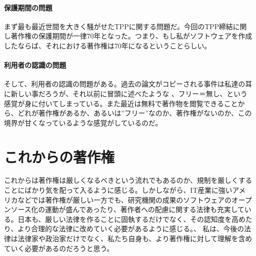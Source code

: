 \documentclass[a4j]{jsarticle}
\begin{document}
\subsection*{保護期間の問題}
まず最も最近世間を大きく騒がせたTPPに関する問題だ。今回のTPP締結に関し著作権の保護期間が一律70年となった。つまり、もし私がソフトウェアを作成したならば、それにおける著作権は70年になるということらしい。\cite{def_re}
\subsection*{利用者の認識の問題}
そして、利用者の認識の問題がある。過去の論文がコピーされる事件は私達の耳に新しい事だろうが、それ以前に冒頭に述べたような 、フリー＝無し、という感覚が身に付いてしまっている。また最近は無料で著作物を閲覧できることから、どれが著作権があるか、あるいは”フリー”なのか、著作権がないのか、この境界が甘くなっているような感覚がしているのだ。
\part{これからの著作権}
これからは著作権は厳しくなるべきという流れでもあるのか、規制を厳しくすることにばかり気を配って入るように感じる。しかしながら、IT産業に強いアメリカなどでは著作権が厳しい一方でも、研究機関の成果のソフトウェアのオープンソース化の運動が盛んであったり、著作者への配慮に関する法律も充実している。日本も、厳しい法律を作ることに固執するだけでなく、その認知度を高めたり、より合理的な法律に改めていく必要があるように感じる。\cite{def_m_o}、
私は、今後の法律は法律家や政治家だけでなく、私たち自身も、より著作権に対して理解を含めていく必要があるのだろうと思う。



\end{document}
